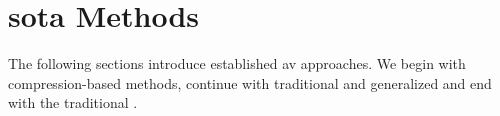 \section{\Acl{sota} Methods}

The following sections introduce established \ac{av} approaches.
We begin with compression-based methods, continue with traditional and generalized \unmasking{} and end with the traditional \impAppr{}.




  
